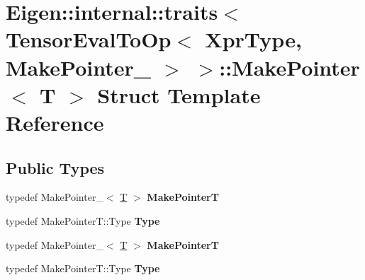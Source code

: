 \hypertarget{struct_eigen_1_1internal_1_1traits_3_01_tensor_eval_to_op_3_01_xpr_type_00_01_make_pointer___01_4_01_4_1_1_make_pointer}{}\section{Eigen\+:\+:internal\+:\+:traits$<$ Tensor\+Eval\+To\+Op$<$ Xpr\+Type, Make\+Pointer\+\_\+ $>$ $>$\+:\+:Make\+Pointer$<$ T $>$ Struct Template Reference}
\label{struct_eigen_1_1internal_1_1traits_3_01_tensor_eval_to_op_3_01_xpr_type_00_01_make_pointer___01_4_01_4_1_1_make_pointer}
\subsection*{Public Types}
\begin{DoxyCompactItemize}
\item 
\mbox{\label{struct_eigen_1_1internal_1_1traits_3_01_tensor_eval_to_op_3_01_xpr_type_00_01_make_pointer___01_4_01_4_1_1_make_pointer_a0f9cc40eef1427b1547580f12867a070}} 
typedef Make\+Pointer\+\_\+$<$ \hyperlink{group___sparse_core___module}{T} $>$ {\bfseries Make\+PointerT}
\item 
\mbox{\label{struct_eigen_1_1internal_1_1traits_3_01_tensor_eval_to_op_3_01_xpr_type_00_01_make_pointer___01_4_01_4_1_1_make_pointer_ac6ba8fc5ef2af9cb2df627a47bf39063}} 
typedef Make\+Pointer\+T\+::\+Type {\bfseries Type}
\item 
\mbox{\label{struct_eigen_1_1internal_1_1traits_3_01_tensor_eval_to_op_3_01_xpr_type_00_01_make_pointer___01_4_01_4_1_1_make_pointer_a0f9cc40eef1427b1547580f12867a070}} 
typedef Make\+Pointer\+\_\+$<$ \hyperlink{group___sparse_core___module}{T} $>$ {\bfseries Make\+PointerT}
\item 
\mbox{\label{struct_eigen_1_1internal_1_1traits_3_01_tensor_eval_to_op_3_01_xpr_type_00_01_make_pointer___01_4_01_4_1_1_make_pointer_ac6ba8fc5ef2af9cb2df627a47bf39063}} 
typedef Make\+Pointer\+T\+::\+Type {\bfseries Type}
\end{DoxyCompactItemize}


